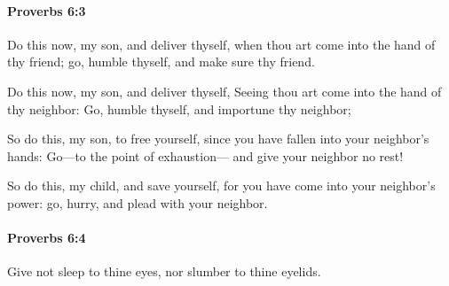 		\paragraph{Proverbs 6:3} %
			\label{PROVERBS-6-3}

			Do this now, my son, and deliver thyself, when thou art come into the hand of thy friend; go, humble thyself, and make sure thy friend.

			\begin{versebox}
					\item[BHS] 
					\item[ASV] Do this now, my son, and deliver thyself, Seeing thou art come into the hand of thy neighbor: Go, humble thyself, and importune thy neighbor;
					\item[NIV] So do this, my son, to free yourself, since you have fallen into your neighbor’s hands: Go—to the point of exhaustion— and give your neighbor no rest!
					\item[NRSV] So do this, my child, and save yourself, for you have come into your neighbor’s power: go, hurry, and plead with your neighbor.
			\end{versebox}

		\paragraph{Proverbs 6:4} %
			\label{PROVERBS-6-4}

			Give not sleep to thine eyes, nor slumber to thine eyelids.

